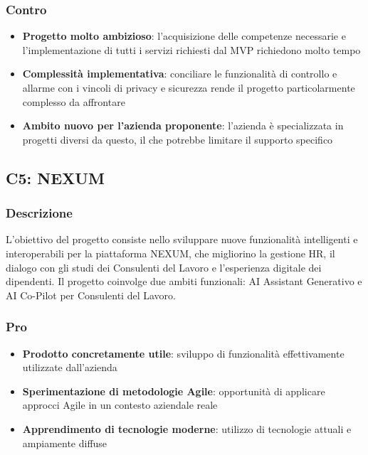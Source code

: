 \documentclass[11pt,a4paper]{article}
\begin{document}
\subsubsection{Contro}
\begin{itemize}
    \item \textbf{Progetto molto ambizioso}: l'acquisizione delle competenze necessarie e l'implementazione di tutti i servizi richiesti dal MVP richiedono molto tempo
    \item \textbf{Complessità implementativa}: conciliare le funzionalità di controllo e allarme con i vincoli di privacy e sicurezza rende il progetto particolarmente complesso da affrontare
    \item \textbf{Ambito nuovo per l'azienda proponente}: l'azienda è specializzata in progetti diversi da questo, il che potrebbe limitare il supporto specifico
\end{itemize}

\vspace{0.5cm}
\subsection{C5: NEXUM}

\subsubsection{Descrizione}
L'obiettivo del progetto consiste nello sviluppare nuove funzionalità intelligenti e interoperabili per la piattaforma NEXUM, che migliorino la gestione HR, il dialogo con gli studi dei Consulenti del Lavoro e l'esperienza digitale dei dipendenti. Il progetto coinvolge due ambiti funzionali: AI Assistant Generativo e AI Co-Pilot per Consulenti del Lavoro.

\subsubsection{Pro}
\begin{itemize}
    \item \textbf{Prodotto concretamente utile}: sviluppo di funzionalità effettivamente utilizzate dall'azienda
    \item \textbf{Sperimentazione di metodologie Agile}: opportunità di applicare approcci Agile in un contesto aziendale reale
    \item \textbf{Apprendimento di tecnologie moderne}: utilizzo di tecnologie attuali e ampiamente diffuse
\end{itemize}
\end{document}
